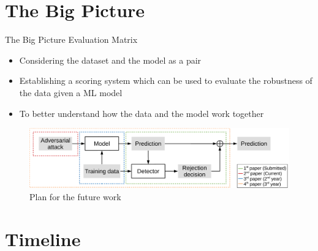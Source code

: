 \documentclass[9pt]{beamer}
\begin{document}
\section{The Big Picture}

\begin{frame}{The Big Picture}
Evaluation Matrix

\begin{itemize}
    \item Considering the dataset and the model as a pair
    \item Establishing a scoring system which can be used to evaluate the robustness of the data given a ML model
    \item To better understand how the data and the model work together
\end{itemize}

\begin{figure}[h!]
    \centering
    \scriptsize
    \includegraphics[width=\linewidth]{images/paper-timeline-diagram.pdf}
    \caption{Plan for the future work}
    \label{fig:timeline-boxes}
\end{figure}

\end{frame}

\section{Timeline}
\end{document}
